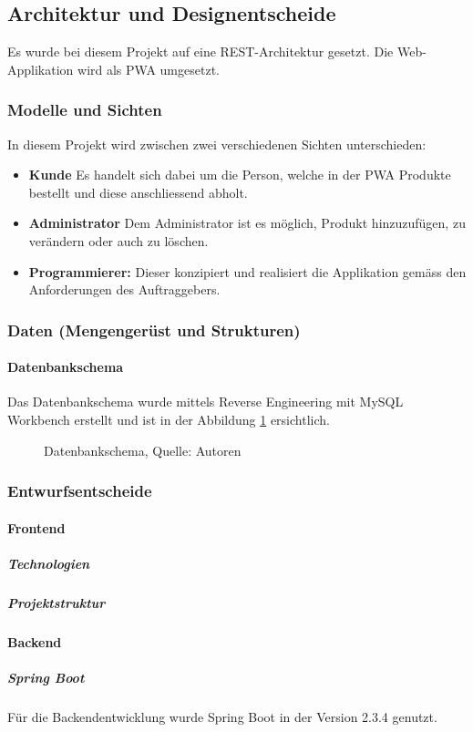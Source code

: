 \newpage
\subsection{Architektur und Designentscheide}
Es wurde bei diesem Projekt auf eine REST-Architektur gesetzt. Die Web-Applikation wird als \ac{PWA} umgesetzt. 
\subsubsection{Modelle und Sichten}
In diesem Projekt wird zwischen zwei verschiedenen Sichten unterschieden:
\begin{itemize}
    \item \textbf{Kunde} Es handelt sich dabei um die Person, welche in der \ac{PWA} Produkte bestellt und diese anschliessend abholt. 
    \item \textbf{Administrator} Dem Administrator ist es möglich, Produkt hinzuzufügen, zu verändern oder auch zu löschen. 
    \item \textbf{Programmierer: } Dieser konzipiert und realisiert die Applikation gemäss den Anforderungen des Auftraggebers.
\end{itemize}
\subsubsection{Daten (Mengengerüst und Strukturen)}
\paragraph{Datenbankschema}
Das Datenbankschema wurde mittels Reverse Engineering mit MySQL Workbench erstellt und ist in der Abbildung \ref{img: datebankschema} ersichtlich.
\begin{figure}[H]
    \centering
    \caption[Datenbankschema]{Datenbankschema, Quelle: Autoren}
    \label{img: datebankschema}
\end{figure}
\subsubsection{Entwurfsentscheide}
\paragraph{Frontend}
\subparagraph{Technologien}

\subparagraph{Projektstruktur}
\paragraph{Backend}
\subparagraph{Spring Boot}
Für die Backendentwicklung wurde Spring Boot in der Version 2.3.4 genutzt.

